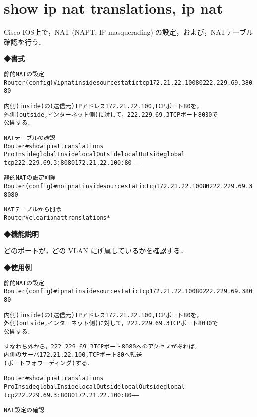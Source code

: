 \section{show ip nat translations, ip nat}
\label{cmd:ios-show-int-status}
Cisco IOS上で，NAT (NAPT, IP masquerading) の設定，および，NATテーブル確認を行う．

\noindent
{\bf ◆書式}
\begin{center}
\begin{screen}
\begin{alltt}
静的 NAT の設定
Router(config)#ip nat inside source static tcp 172.21.22.100 80 222.229.69.3 8080

内側(inside) の(送信元)IPアドレス 172.21.22.100, TCP ポート 80 を，
外側(outside, インターネット側) に対して，222.229.69.3 TCP ポート 8080 で
公開する．

NATテーブルの確認
Router#show ip nat translations
Pro Inside global         Inside local          Outside local         Outside global
tcp 222.229.69.3:8080     172.21.22.100:80      ---                   ---

静的 NAT の設定削除
Router(config)#no ip nat inside source static tcp 172.21.22.100 80 222.229.69.3 8080

NATテーブルから削除
Router#clear ip nat translations *

\end{alltt}
\end{screen}
\end{center}


{\bf ◆機能説明}

どのポートが，どの VLAN に所属しているかを確認する．

{\bf ◆使用例}
\begin{center}
\begin{breakbox}
\begin{alltt}
静的 NAT の設定
Router(config)#ip nat inside source static tcp 172.21.22.100 80 222.229.69.3 8080

内側(inside) の(送信元)IPアドレス 172.21.22.100, TCP ポート 80 を，
外側(outside, インターネット側) に対して，222.229.69.3 TCP ポート 8080 で
公開する．

すなわち外から，222.229.69.3 TCP ポート 8080 へのアクセスがあれば，
内側のサーバ 172.21.22.100, TCP ポート 80 へ転送
(ポートフォワーディング)する．

Router#show ip nat translations
Pro Inside global         Inside local          Outside local         Outside global
tcp 222.229.69.3:8080     172.21.22.100:80      ---                   ---

NAT 設定の確認
\end{alltt}
\end{breakbox}
\end{center}
                

